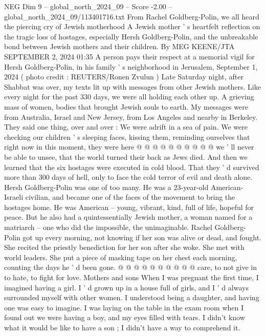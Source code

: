 \begin{textsample}{NEG Dim 9 – global\_north\_2024\_09 – Score -2.00 – global\_north\_2024\_09/113401716.txt}  \label{ex:f9_neg_208}
From Rachel Goldberg-Polin, we all heard the piercing cry of Jewish motherhood A Jewish mother ' s heartfelt reflection on the tragic loss of hostages, especially Hersh Goldberg-Polin, and the unbreakable bond between Jewish mothers and their children.
By MEG KEENE/JTA SEPTEMBER 2, 2024 01:35 A person pays their respect at a memorial vigil for Hersh Goldberg-Polin, in his family ' s neighborhood in Jerusalem, September 1, 2024 ( photo credit : REUTERS/Ronen Zvulun ) Late Saturday night, after Shabbat was over, my texts lit up with messages from other Jewish mothers.
Like every night for the past 330 days, we were all holding each other up.
A grieving mass of women, bodies that brought Jewish souls to earth.
My messages were from Australia, Israel and New Jersey, from Los Angeles and nearby in Berkeley.
They said one thing, over and over : We were adrift in a sea of pain.
We were checking our children ' s sleeping faces, kissing them, reminding ourselves that right now in this moment, they were here @ @ @ @ @ @ @ @ @ @ we ' ll never be able to unsee, that the world turned their back as Jews died.
And then we learned that the six hostages were executed in cold blood.
That they ' d survived more than 300 days of hell, only to face the cold terror of evil and death alone.
Hersh Goldberg-Polin was one of too many.
He was a 23-year-old American-Israeli civilian, and became one of the faces of the movement to bring the hostages home.
He was American -- young, vibrant, kind, full of life, hopeful for peace.
But he also had a quintessentially Jewish mother, a woman named for a matriarch -- one who did the impossible, the unimaginable.
Rachel Goldberg-Polin got up every morning, not knowing if her son was alive or dead, and fought.
She recited the priestly benediction for her son after she woke.
She met with world leaders.
She put a piece of masking tape on her chest each morning, counting the days he ' d been gone. @ @ @ @ @ @ @ @ @ @ care, to not give in to hate, to fight for love.
Mothers and sons When I was pregnant the first time, I imagined having a girl.
I ' d grown up in a house full of girls, and I ' d always surrounded myself with other women.
I understood being a daughter, and having one was easy to imagine.
I was laying on the table in the exam room when I found out we were having a boy, and my eyes filled with tears.
I didn't know what it would be like to have a son ; I didn't have a way to comprehend it.

\end{textsample}
